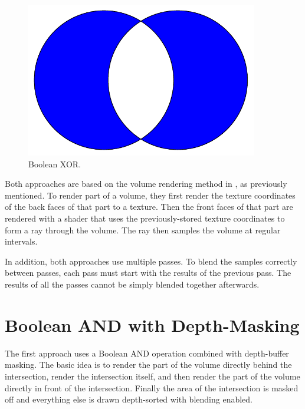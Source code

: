 \documentclass{report}
\begin{document}
\begin{figure}
\centering
\includegraphics[width=0.9\textwidth]{venn-xor.pdf}
\caption{Boolean XOR.}
\label{boolean-xor-venn-diagram}
\end{figure}

Both approaches are based on the volume rendering method in \cite{Kruger03}, as
previously mentioned.  To render part of a volume, they first render the texture
coordinates of the back faces of that part to a texture.  Then the front faces
of that part are rendered with a shader that uses the previously-stored texture
coordinates to form a ray through the volume.  The ray then samples the volume
at regular intervals.

In addition, both approaches use multiple passes.  To blend the samples
correctly between passes, each pass must start with the results of the previous
pass.  The results of all the passes cannot be simply blended together
afterwards.

\section{Boolean AND with Depth-Masking}

The first approach uses a Boolean AND operation combined with depth-buffer
masking.  The basic idea is to render the part of the volume directly behind the
intersection, render the intersection itself, and then render the part of the
volume directly in front of the intersection.  Finally the area of the
intersection is masked off and everything else is drawn depth-sorted with
blending enabled.
\end{document}
